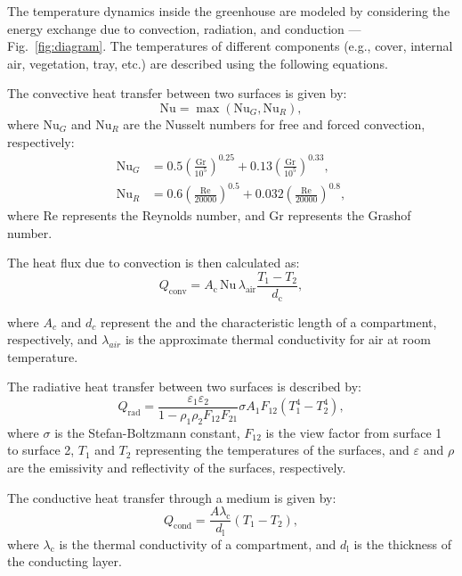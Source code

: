 \documentclass[conference]{IEEEtran}
\begin{document}
The temperature dynamics inside the greenhouse are modeled by considering the energy exchange due to convection, radiation, and conduction --- Fig.~\ref{fig:diagram}. The temperatures of different components (e.g., cover, internal air, vegetation, tray, etc.) are described using the following equations.

The convective heat transfer between two surfaces is given by:
\begin{equation}
    \text{Nu} = \max \left( \text{Nu}_G, \text{Nu}_R \right),
\end{equation}
where \(\text{Nu}_G\) and \(\text{Nu}_R\) are the Nusselt numbers for free and forced convection, respectively:
\begin{align}
    \text{Nu}_G & = 0.5  {\left( \frac{\text{Gr}}{10^5} \right)}^{0.25} + 0.13  {\left(\frac{\text{Gr}}{10^5}\right)}^{0.33}, \\
    \text{Nu}_R & = 0.6  {\left(\frac{\text{Re}}{20000}\right)}^{0.5} + 0.032  {\left(\frac{\text{Re}}{20000}\right)}^{0.8},
\end{align}
where Re represents the Reynolds number, and Gr represents the Grashof number.

The heat flux due to convection is then calculated as:
\begin{equation}
    Q_{\text{conv}} = A_{\text{c}}\, \text{Nu}\, \lambda_{\text{air}} \frac{T_1 - T_2}{d_{\text{c}}},
\end{equation}

where \(A_c\) and \(d_c\) represent the and the characteristic length of a compartment, respectively, and \(\lambda_{air}\) is the approximate thermal conductivity for air at room temperature.

The radiative heat transfer between two surfaces is described by:
\begin{equation}
    Q_{\text{rad}} = \frac{\varepsilon_1  \varepsilon_2}{1 - \rho_1  \rho_2  F_{12}  F_{21}}  \sigma  A_1  F_{12}  \left( T_1^4 - T_2^4 \right),
\end{equation}
where \(\sigma \) is the Stefan-Boltzmann constant, \(F_{12}\) is the view factor from surface 1 to surface 2, \(T_1\) and \(T_2\) representing the temperatures of the surfaces, and \(\varepsilon \) and \(\rho \) are the emissivity and reflectivity of the surfaces, respectively.

The conductive heat transfer through a medium is given by:
\begin{equation}
    Q_{\text{cond}} = \frac{A \lambda_{\text{c}}}{d_\text{l}} (T_1 - T_2),
\end{equation}
where \(\lambda_{\text{c}} \) is the thermal conductivity of a compartment, and \(d_{\text{l}}\) is the thickness of the conducting layer.
\end{document}
